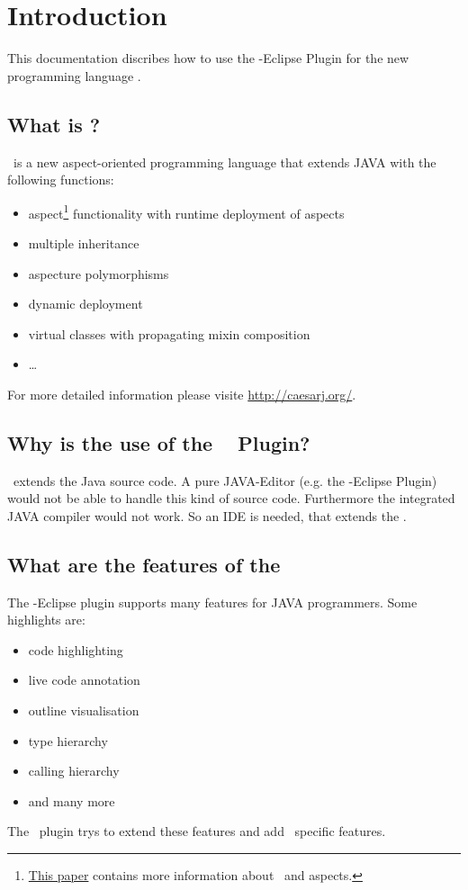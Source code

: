 \section{Introduction}
This documentation discribes how to use the \caesarj -Eclipse Plugin for the new programming language \caesarj.
\subsection{What is \caesarj ?}
\caesar ~is a new aspect-oriented programming language that extends JAVA with the following functions:
\begin{itemize}
	\item aspect\footnote{\href{http://www.st.informatik.tu-darmstadt.de/database/publications/data/aosd03.pdf?id=70}{This paper} contains more information about \caesarj ~and aspects.} functionality with runtime deployment of aspects
	\item multiple inheritance
	\item aspecture polymorphisms
	\item dynamic deployment
	\item virtual classes with propagating mixin composition
	\item \dots
\end{itemize}
For more detailed information please visite \href{http://caesarj.org/}{http://caesarj.org/}.

\subsection{Why is the use of the \caesarj ~ Plugin?}
\caesarj ~extends the Java source code. A pure JAVA-Editor (e.g. the \jdt -Eclipse Plugin) would not be able to handle this kind of source code. Furthermore the integrated JAVA compiler would not work. So an IDE is needed, that extends the \jdt. 
\subsection{What are the features of the \jdt}
The \jdt -Eclipse plugin supports many features for JAVA programmers. Some highlights are:
\begin{itemize}
	\item code highlighting
	\item live code annotation 
	\item outline visualisation
	\item type hierarchy
	\item calling hierarchy
	\item and many more
\end{itemize}
The \caesarj ~plugin trys to extend these features and add \caesarj ~specific features.

